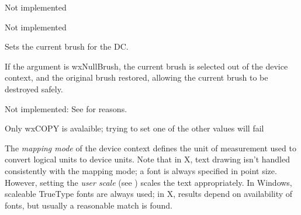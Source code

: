 
Not implemented 


\label{wxlatexdcsetpalette}


Not implemented 

\label{wxlatexdcsetbrush}


Sets the current brush for the DC.

If the argument is wxNullBrush, the current brush is selected out of the device
context, and the original brush restored, allowing the current brush to
be destroyed safely.



\label{wxlatexdcsetfont}


Not implemented: See  for reasons.


\label{wxlatexdcsetlogicalfunction}



Only wxCOPY is avalaible; trying to set one of the other values will fail

\label{wxlatexdcsetmapmode}


The {\it mapping mode} of the device context defines the unit of
measurement used to convert logical units to device units. Note that
in X, text drawing isn't handled consistently with the mapping mode; a
font is always specified in point size. However, setting the {\it
user scale} (see ) scales the text appropriately. In
Windows, scaleable TrueType fonts are always used; in X, results depend
on availability of fonts, but usually a reasonable match is found.

